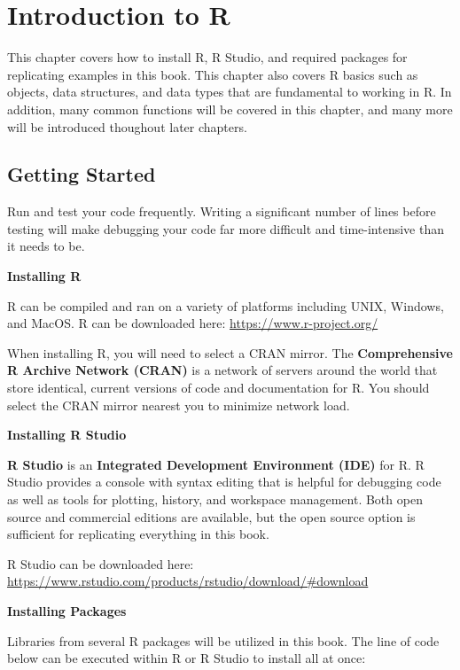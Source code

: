 \documentclass[]{book}
\begin{document}
\hypertarget{r-intro}{%
\chapter{Introduction to R}\label{r-intro}}

This chapter covers how to install R, R Studio, and required packages for replicating examples in this book. This chapter also covers R basics such as objects, data structures, and data types that are fundamental to working in R. In addition, many common functions will be covered in this chapter, and many more will be introduced thoughout later chapters.

\hypertarget{getting-started-1}{%
\section{Getting Started}\label{getting-started-1}}

Run and test your code frequently. Writing a significant number of lines before testing will make debugging your code far more difficult and time-intensive than it needs to be.

\textbf{Installing R}

R can be compiled and ran on a variety of platforms including UNIX, Windows, and MacOS. R can be downloaded here: \url{https://www.r-project.org/}

When installing R, you will need to select a CRAN mirror. The \textbf{Comprehensive R Archive Network (CRAN)} is a network of servers around the world that store identical, current versions of code and documentation for R. You should select the CRAN mirror nearest you to minimize network load.

\textbf{Installing R Studio}

\textbf{R Studio} is an \textbf{Integrated Development Environment (IDE)} for R. R Studio provides a console with syntax editing that is helpful for debugging code as well as tools for plotting, history, and workspace management. Both open source and commercial editions are available, but the open source option is sufficient for replicating everything in this book.

R Studio can be downloaded here: \url{https://www.rstudio.com/products/rstudio/download/\#download}

\textbf{Installing Packages}

Libraries from several R packages will be utilized in this book. The line of code below can be executed within R or R Studio to install all at once:
\end{document}
